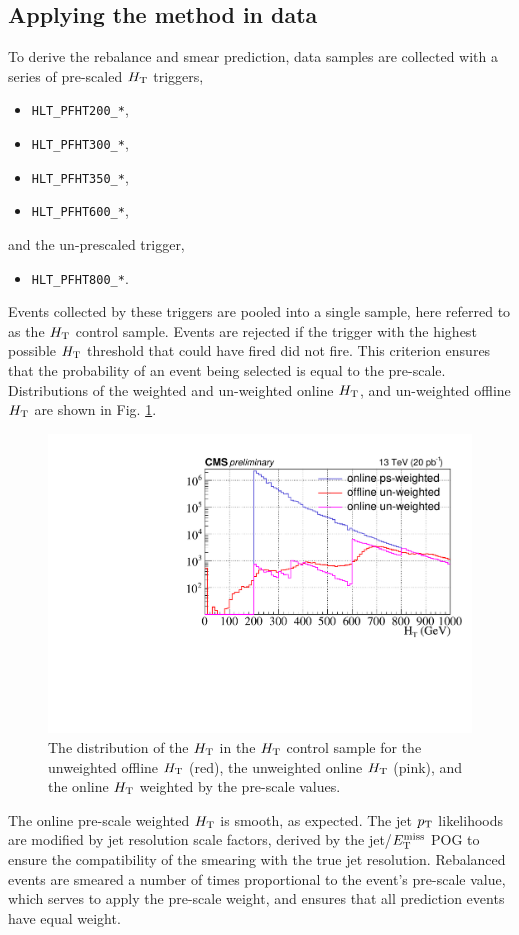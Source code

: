 \subsection{Applying the method in data}
To derive the rebalance and smear prediction, data samples are collected with a series of pre-scaled $H_{\rm T}$ triggers,
\begin{itemize}
  \item \texttt{HLT\_PFHT200\_*},
    \item \texttt{HLT\_PFHT300\_*},
      \item \texttt{HLT\_PFHT350\_*},
        \item \texttt{HLT\_PFHT600\_*},
\end{itemize}
and the un-prescaled trigger,
\begin{itemize}
  \item \texttt{HLT\_PFHT800\_*}.
\end{itemize}
Events collected by these triggers are pooled into a single sample, here referred to as the $H_{\rm T}$ control sample. Events are rejected if the trigger with the highest possible $H_{\rm T}$ threshold that could have fired did not fire. This criterion ensures that the probability of an event being selected is equal to the pre-scale. Distributions of the weighted and un-weighted online $H_{\rm T}$, and un-weighted offline $H_{\rm T}$ are shown in Fig. \ref{fig:PrescaleWeights}.
\begin{figure}[tb!]
\centering
\includegraphics[width=0.6\linewidth]{figures/SusySearches/Ra2b2016/PrescaleWeightsHT2.pdf}
\caption{The distribution of the $H_{\rm T}$ in the $H_{\rm T}$ control sample for the unweighted offline $H_{\rm T}$ (red), the unweighted online $H_{\rm T}$ (pink), and the online $H_{\rm T}$ weighted by the pre-scale values.}
\label{fig:PrescaleWeights}
\end{figure}
The online pre-scale weighted $H_{\rm T}$ is smooth, as expected. The jet $p_{\text{T}}$ likelihoods are modified by jet resolution scale factors, derived by the jet/$E_{\text{T}}^{\rm miss}$ POG \cite{jetmet2} to ensure the compatibility of the smearing with the true jet resolution. Rebalanced events are smeared a number of times proportional to the event's pre-scale value, which serves to apply the pre-scale weight, and ensures that all prediction events have equal weight.

